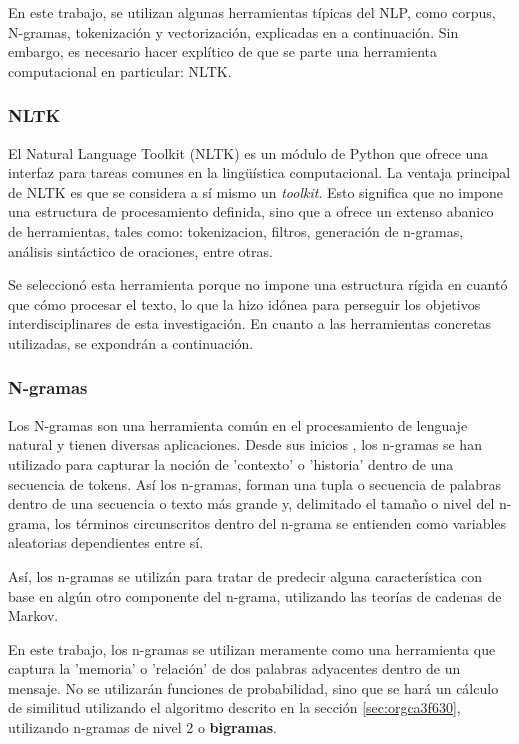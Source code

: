 \documentclass[12pt,letterpaper,twoside]{article}
\begin{document}
En este trabajo, se utilizan algunas herramientas típicas del
NLP, como corpus, N-gramas, tokenización y vectorización, explicadas
en a continuación. Sin embargo, es necesario hacer explítico de
que se parte una herramienta computacional en particular: NLTK.

\subsubsection{NLTK}
\label{sec:org88564fb}
El Natural Language Toolkit (NLTK) es un módulo de Python que ofrece
una interfaz para tareas comunes en la lingüística computacional. La
ventaja principal de NLTK es que se considera a sí mismo un
\emph{toolkit}. Esto significa que no impone una estructura de
procesamiento definida, sino que a ofrece un extenso abanico de
herramientas, tales como: tokenizacion, filtros, generación de
n-gramas, análisis sintáctico de oraciones, entre otras.

Se seleccionó esta herramienta porque no impone una estructura
rígida en cuantó que cómo procesar el texto, lo que la hizo
idónea para perseguir los objetivos interdisciplinares de esta
investigación. En cuanto a las herramientas concretas utilizadas,
se expondrán a continuación.

\subsubsection{N-gramas}
\label{sec:org974f038}

Los N-gramas son una herramienta común en el procesamiento
de lenguaje natural y tienen diversas aplicaciones. Desde sus
inicios \cite{manning1999foundations}, los n-gramas se han
utilizado para capturar la noción de 'contexto' o 'historia'
dentro de una secuencia de tokens. Así los n-gramas, forman
una tupla o secuencia de palabras dentro de una secuencia
o texto más grande y, delimitado el tamaño o nivel del
n-grama, los términos circunscritos dentro del n-grama
se entienden como variables aleatorias dependientes entre sí.

Así, los n-gramas se utilizán para tratar de predecir alguna
característica con base en algún otro componente del n-grama,
utilizando las teorías de cadenas de Markov.

En este trabajo, los n-gramas se utilizan meramente
como una herramienta que captura la 'memoria' o 'relación'
de dos palabras adyacentes dentro de un mensaje. No se
utilizarán funciones de probabilidad, sino que se hará
un cálculo de similitud utilizando el algoritmo descrito
en la sección  \ref{sec:orgca3f630}, utilizando
n-gramas de nivel 2 o \textbf{bigramas}.
\end{document}

